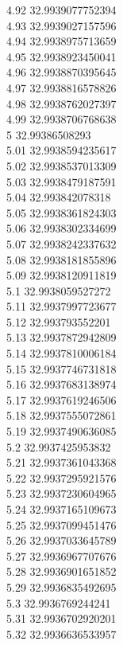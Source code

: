 {4.92	32.9939077752394\\
4.93	32.9939027157596\\
4.94	32.9938975713659\\
4.95	32.9938923450041\\
4.96	32.9938870395645\\
4.97	32.9938816578826\\
4.98	32.9938762027397\\
4.99	32.9938706768638\\
5	32.99386508293\\
5.01	32.9938594235617\\
5.02	32.9938537013309\\
5.03	32.9938479187591\\
5.04	32.993842078318\\
5.05	32.9938361824303\\
5.06	32.9938302334699\\
5.07	32.9938242337632\\
5.08	32.9938181855896\\
5.09	32.9938120911819\\
5.1	32.9938059527272\\
5.11	32.9937997723677\\
5.12	32.993793552201\\
5.13	32.9937872942809\\
5.14	32.9937810006184\\
5.15	32.9937746731818\\
5.16	32.9937683138974\\
5.17	32.9937619246506\\
5.18	32.9937555072861\\
5.19	32.9937490636085\\
5.2	32.9937425953832\\
5.21	32.9937361043368\\
5.22	32.9937295921576\\
5.23	32.9937230604965\\
5.24	32.9937165109673\\
5.25	32.9937099451476\\
5.26	32.9937033645789\\
5.27	32.9936967707676\\
5.28	32.9936901651852\\
5.29	32.9936835492695\\
5.3	32.9936769244241\\
5.31	32.9936702920201\\
5.32	32.9936636533957\\
}
